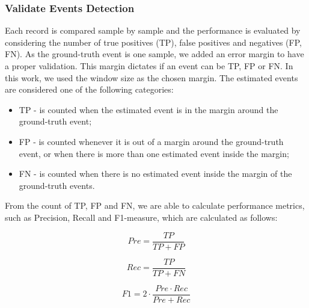 \subsubsection{Validate Events Detection}

Each record is compared sample by sample and the performance is evaluated by considering the number of true positives (TP), false positives and negatives (FP, FN). As the ground-truth event is one sample, we added an error margin to have a proper validation. This margin dictates if an event can be TP, FP or FN. In this work, we used the window size as the chosen margin. The estimated events are considered one of the following categories:

\begin{itemize}
    \item TP - is counted when the estimated event is in the margin around the ground-truth event;
    
    \item FP - is counted whenever it is out of a margin around the ground-truth event, or when there is more than one estimated event inside the margin;
    
    \item FN - is counted when there is no estimated event inside the margin of the ground-truth events.
    
\end{itemize}


From the count of TP, FP and FN, we are able to calculate performance metrics, such as Precision, Recall and F1-measure, which are calculated as follows:

\begin{equation}
    Pre = \frac{TP}{TP+FP}
\end{equation}

\begin{equation}
    Rec = \frac{TP}{TP+FN}
\end{equation}

\begin{equation}
    F1 = 2 \cdot \frac{Pre \cdot Rec}{Pre+Rec}
\end{equation}

